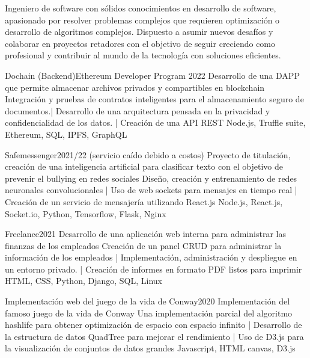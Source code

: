 \documentclass[9pt,a4paper,icons,colors]{Resume}
\begin{document}
\begin{paracol}{2}

Ingeniero de software con sólidos conocimientos en desarrollo de software, apasionado por resolver problemas complejos que requieren optimización o desarrollo de algoritmos complejos. Dispuesto a asumir nuevos desafíos y colaborar en proyectos retadores con el objetivo de seguir creciendo como profesional y contribuir al mundo de la tecnología con soluciones eficientes.

\cvproject
{Dochain (Backend)}{Ethereum Developer Program 2022}
{ }
{Desarrollo de una DAPP que permite almacenar archivos privados y compartibles en blockchain }
{Integración y pruebas de contratos inteligentes para el almacenamiento seguro de documentos.|
Desarrollo de una arquitectura pensada en la privacidad y confidencialidad de los datos. |
Creación de una API REST} 
{Node.js, Truffle suite, Ethereum, SQL, IPFS, GraphQL}

\divider

\cvproject
{Safemessenger}{2021/22}
{ (servicio caído debido a costos)}
{Proyecto de titulación, creación de una inteligencia artificial para clasificar texto con el objetivo de prevenir el bullying en redes sociales}
{Diseño, creación y entrenamiento de redes neuronales convolucionales |
Uso de web sockets para mensajes en tiempo real |
Creación de un servicio de mensajería utilizando React.js}
{Node.js, React.js, Socket.io, Python, Tensorflow, Flask, Nginx}
\divider

\cvproject
{Freelance}{2021}
{}
{Desarrollo de una aplicación web interna para administrar las finanzas de los empleados}
{Creación de un panel CRUD para administrar la información de los empleados | 
Implementación, administración y despliegue en un entorno privado. |
Creación de informes en formato PDF listos para imprimir}
{HTML, CSS, Python, Django, SQL, Linux}
\divider

\cvproject
{Implementación web del juego de la vida de Conway}{2020}
{}
{Implementación del famoso juego de la vida de Conway}
{Una implementación parcial del algoritmo hashlife para obtener optimización de espacio con espacio infinito |
Desarrollo de la estructura de datos QuadTree para mejorar el rendimiento |
Uso de D3.js para la visualización de conjuntos de datos grandes}
{Javascript, HTML canvas, D3.js}
\divider


\end{paracol}
\end{document}

